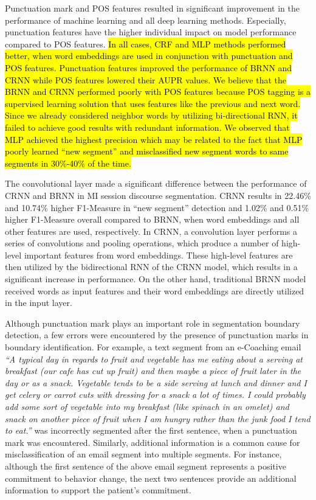 \documentclass{amia}
\begin{document}
Punctuation mark and POS features resulted in significant improvement in the performance of machine learning and all deep learning methods. Especially, punctuation features have the higher individual impact on model performance compared to POS features. \hl{In all cases, CRF and MLP methods performed better, when word embeddings are used in conjunction with punctuation and POS features. Punctuation features improved the performance of BRNN and CRNN while POS features lowered their AUPR values. We believe that the BRNN and CRNN performed poorly with POS features because POS tagging is a supervised learning solution that uses features like the previous and next word. Since we already considered neighbor words by utilizing bi-directional RNN, it failed to achieve good results with redundant information. We observed that MLP achieved the highest precision which may be related to the fact that MLP poorly learned ``new segment'' and misclassified new segment words to same segments in 30\%-40\% of the time.}

The convolutional layer made a significant difference between the performance of CRNN and BRNN in MI session discourse segmentation. CRNN results in 22.46\% and 10.74\% higher F1-Measure in ``new segment'' detection and 1.02\% and 0.51\% higher F1-Measure overall compared to BRNN, when word embeddings and all other features are used, respectively. In CRNN, a convolution layer performs a series of convolutions and pooling operations, which produce a number of high-level important features from word embeddings. These high-level features are then utilized by the bidirectional RNN of the CRNN model, which results in a significant increase in performance. On the other hand, traditional BRNN model received words as input features and their word embeddings are directly utilized in the input layer.     

Although punctuation mark plays an important role in segmentation boundary detection, a few errors were encountered by the presence of punctuation marks in boundary identification. For example, a text segment from an e-Coaching email \textit{``A typical day in regards to fruit and vegetable has me eating about a serving at breakfast (our cafe has cut up fruit) and then maybe a piece of fruit later in the day or as a snack. Vegetable tends to be a side serving at lunch and dinner and I get celery or carrot cuts with dressing for a snack a lot of times. I could probably add some sort of vegetable into my breakfast (like spinach in an omelet) and snack on another piece of fruit when I am hungry rather than the junk food I tend to eat.''} was incorrectly segmented after the first sentence, when a punctuation mark was encountered. Similarly, additional information is a common cause for misclassification of an email segment into multiple segments. For instance, although the first sentence of the above email segment represents a positive commitment to behavior change, the next two sentences provide an additional information to support the patient's commitment. 
\end{document}
